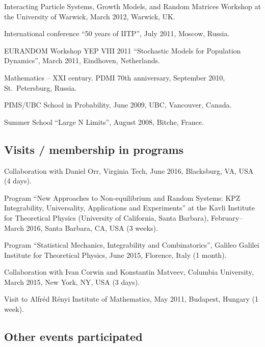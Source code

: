 \documentclass[letterpaper,11pt]{article}
\begin{document}
\begin{etaremune}
\item 
Interacting Particle Systems, Growth Models, and Random Matrices Workshop at the University of Warwick, March 2012, Warwick, UK.


\item International conference ``50 years of IITP'', July 2011, Moscow, Russia.
  
\item EURANDOM Workshop YEP VIII 2011 ``Stochastic Models for Population Dynamics'', March 2011, Eindhoven, Netherlands.

\item Mathematics -- XXI century. PDMI 70th anniversary, September 2010, St.~Petersburg, Russia.

\item PIMS/UBC School in Probability, June 2009, UBC, Vancouver, Canada. 

\item 
Summer School ``Large N Limits'', August 2008, Bitche, France. 
\end{etaremune}

\subsection*{Visits / membership in programs}

\begin{etaremune}
	\item Collaboration with Daniel Orr, 
	Virginia Tech, 
	June 2016,
	Blacksburg, VA, USA (4 days).
	\item
	Program ``New Approaches to Non-equilibrium and Random Systems: KPZ Integrability, Universality, Applications and Experiments''
	at the Kavli Institute for Theoretical Physics (University of California, Santa Barbara),
	February--March 2016, Santa Barbara, CA, USA (3 weeks).
	\item
	Program ``Statistical Mechanics, Integrability and Combinatorics'',
	Galileo Galilei Institute for Theoretical Physics, June 2015, Florence, Italy (1 month).
	\item Collaboration with Ivan Corwin and Konstantin Matveev,
	Columbia University, March 2015, New York, NY, USA (3 days).
	\item Visit to Alfr\'ed R\'enyi Institute of Mathematics,
	May 2011, Budapest, Hungary (1 week).
\end{etaremune}

\subsection*{Other events participated}
\end{document}
